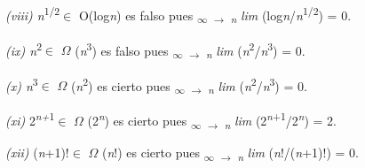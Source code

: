 \documentclass[12pt]{article}
\renewcommand{\_}{\kern-1.5pt\textunderscore\kern-1.5pt}
\begin{document}
\begin{adjustwidth}{0.58in}{2.26in}
{\fontsize{10pt}{12.0pt}\selectfont \textit{(viii) n}\textsuperscript{1/2}$ \in $ O(log\textit{n}) es falso pues \textsubscript{$\infty$ $ \rightarrow $ \textit{n }}\textit{lim }(log\textit{n}/\textit{n}\textsuperscript{1/2}) = 0. \par}\par

\end{adjustwidth}

\begin{adjustwidth}{0.58in}{2.7in}
{\fontsize{10pt}{12.0pt}\selectfont \textit{(ix) n}\textsuperscript{2}$ \in $ $ \Omega $ (\textit{n}\textsuperscript{3}) es falso pues \textsubscript{$\infty$ $ \rightarrow $ \textit{n }}\textit{lim }(\textit{n}\textsuperscript{2}/\textit{n}\textsuperscript{3}) = 0. \par}\par

\end{adjustwidth}

\begin{adjustwidth}{0.58in}{2.65in}
{\fontsize{10pt}{12.0pt}\selectfont \textit{(x) n}\textsuperscript{3}$ \in $ $ \Omega $ (\textit{n}\textsuperscript{2}) es cierto pues \textsubscript{$\infty$ $ \rightarrow $ \textit{n }}\textit{lim }(\textit{n}\textsuperscript{2}/\textit{n}\textsuperscript{3}) = 0. \par}\par

\end{adjustwidth}

\begin{adjustwidth}{0.58in}{2.43in}
{\fontsize{10pt}{12.0pt}\selectfont \textit{(xi) }2\textit{\textsuperscript{n+}}\textsuperscript{1}$ \in $ $ \Omega $ (2\textit{\textsuperscript{n}}) es cierto pues \textsubscript{$\infty$ $ \rightarrow $ \textit{n }}\textit{lim }(2\textit{\textsuperscript{n}}\textsuperscript{+1}/2\textit{\textsuperscript{n}}) = 2. \par}\par

\end{adjustwidth}

\begin{adjustwidth}{0.58in}{2.12in}
{\fontsize{10pt}{12.0pt}\selectfont \textit{(xii) }(\textit{n}+1)!$ \in $ $ \Omega $ (\textit{n}!) es cierto pues \textsubscript{$\infty$ $ \rightarrow $ \textit{n }}\textit{lim }(\textit{n}!/(\textit{n}+1)!) = 0. \par}\par

\end{adjustwidth}
\end{document}
